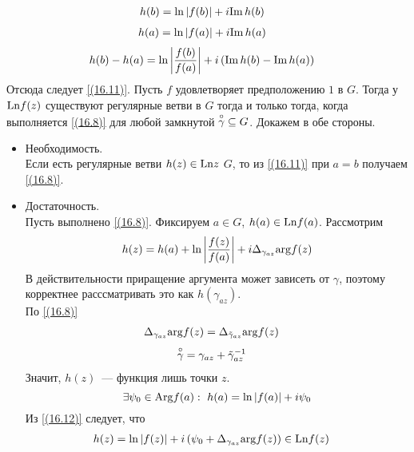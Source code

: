 \begin{align*}
  & h(b) = \ln \left| f(b) \right| + i \mathrm{Im}\, h(b)
\end{align*}
\begin{align*}
  & h(a) = \ln \left| f(a) \right| + i \mathrm{Im}\, h(a)
\end{align*}
\begin{align*}
  & h(b) - h(a) = \ln \left| \frac{f(b)}{f(a)} \right| + i \left( \mathrm{Im}\, h(b) - \mathrm{Im}\, h(a) \right)
\end{align*}
Отсюда следует \eqref{(16.11)}.
\theorem
Пусть $f$ удовлетворяет предположению $1$ в $G$. Тогда у  $\mathrm{Ln} f(z)$ существуют
регулярные ветви в $G$ тогда и только тогда, когда выполняется \eqref{(16.8)}
для любой замкнутой $\overset{\circ}{\gamma}\subseteq G$.
\pr
Докажем в обе стороны.
\begin{itemize}
    \item Необходимость.
    \\
    Если есть регулярные ветви $h(z) \in \mathrm{Ln} z$  $G$, то из \eqref{(16.11)} при
    $a = b$ получаем \eqref{(16.8)}.
    \item Достаточность.
    \\
    Пусть выполнено \eqref{(16.8)}. Фиксируем $a \in G$, $h(a) \in \mathrm{Ln} f(a)$.
    Рассмотрим
    \begin{equation}\label{(16.12)}
        h(z) = h(a) + \ln \left| \frac{f(z)}{f(a)} \right| + i \Delta_{\gamma_{az}}\mathrm{arg} f(z)
    \end{equation}
    В действительности приращение аргумента может зависеть от $\gamma$, поэтому
    корректнее расссматривать это как $h(\gamma_{az})$.
    \\
    По \eqref{(16.8)}
    \begin{align*}
      & \Delta_{\gamma_{az}}\mathrm{arg} f(z) = \Delta_{\tilde{\gamma}_{az}}\mathrm{arg} f(z)
    \end{align*}
    \begin{align*}
      & \overset{\circ}{\gamma} = \gamma_{az}+\tilde{\gamma}^{-1}_{az}
    \end{align*}
    Значит, $h(z)$~--- функция лишь точки $z$.
    \begin{equation}\label{(16.13)}
        \exists \psi_0 \in \mathrm{Arg} f(a): \ h(a) = \ln \left| f(a) \right| + i \psi_0
    \end{equation}
    Из \eqref{(16.12)} следует, что
    \begin{align*}
      & h(z) = \ln \left| f(z) \right| + i \left( \psi_0 + \Delta_{\gamma_{az}}\mathrm{arg} f(z) \right) \in \mathrm{Ln} f(z)
    \end{align*}

\end{itemize}
